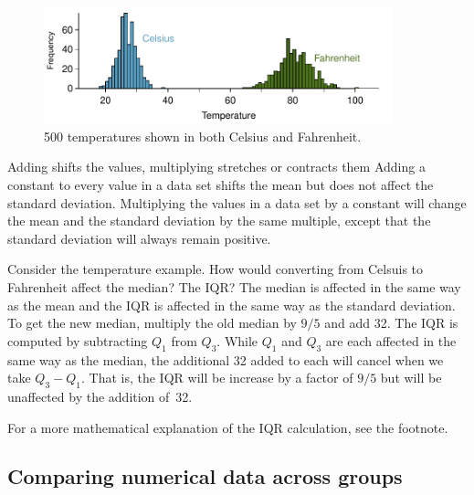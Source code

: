 \begin{figure}[h]
   \centering
   \includegraphics[width=0.9\textwidth]{ch_summarizing_data/figures/CToF_ConversionFigure/CToF_ConversionFigure}
   \caption{500 temperatures shown in both Celsius and \mbox{Fahrenheit.}}
   \label{CToF_ConversionFigure}
\end{figure}


\begin{onebox}{Adding shifts the values, multiplying stretches or contracts them}
Adding a constant to every value in a data set shifts the mean but does not affect the standard deviation. Multiplying the values in a data set by a constant will change the mean and the standard deviation by the same multiple, except that the standard deviation will always remain positive.\end{onebox}

\begin{examplewrap}
\begin{nexample}{Consider the temperature example. How would converting from Celsuis to Fahrenheit affect the median? The IQR?}
The median is affected in the same way as the mean and the IQR is affected in the same way as the standard deviation. To get the new median, multiply the old median by $9/5$ and add 32. The IQR is computed by subtracting $Q_1$ from $Q_3$. While $Q_1$ and $Q_3$ are each affected in the same way as the median, the additional 32 added to each will cancel when we take $Q_3 - Q_1$. That is, the IQR will be increase by a factor of $9/5$ but will be unaffected by the addition of~32.

For a more mathematical explanation of the IQR calculation, see the footnote.\footnotemark
\end{nexample}
\end{examplewrap}

\subsection{Comparing numerical data across groups}
\label{comparingAcrossGroups}

